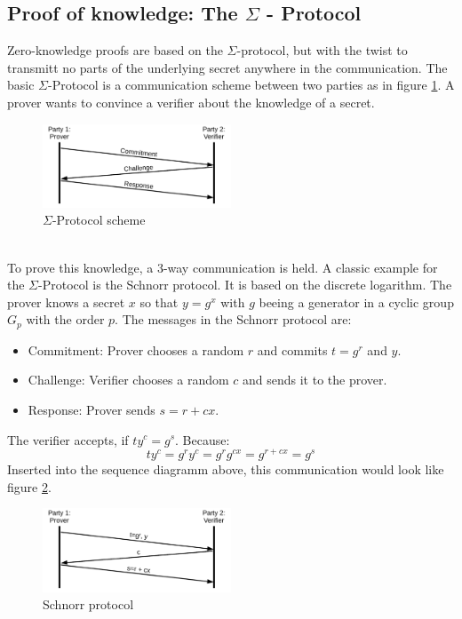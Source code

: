 \documentclass[]{article}
\begin{document}
\subsection{Proof of knowledge: The $\Sigma$ - Protocol}
Zero-knowledge proofs are based on the $\Sigma$-protocol, but with the twist to transmitt no parts of the underlying secret anywhere in the communication. The basic $\Sigma$-Protocol is a communication scheme between two parties as in figure \ref{fig:sigma}. A prover wants to convince a verifier about the knowledge of a secret. 
\begin{figure}[htbp]
\center
\includegraphics[width=0.5\textwidth]{pics/sigma.pdf}
\caption{$\Sigma$-Protocol scheme}
\label{fig:sigma}
\end{figure}\\
To prove this knowledge, a 3-way communication is held. A classic example for the $\Sigma$-Protocol is the Schnorr protocol. It is based on the discrete logarithm. The prover knows a secret $x$ so that $y=g^{x}$ with $g$ beeing a generator in a cyclic group $G_{p}$ with the order $p$. The messages in the Schnorr protocol are:
\begin{itemize}
\item{Commitment: Prover chooses a random $r$ and commits $t = g^{r}$ and $y$.}
\item{Challenge: Verifier chooses a random $c$ and sends it to the prover.}
\item{Response: Prover sends $s = r + cx$.}
\end{itemize}
The verifier accepts, if $ty^{c} = g^{s}$. Because:
\[ty^{c} = g^{r}y^{c} = g^{r}g^{cx} = g^{r + cx} = g^{s}\]
Inserted into the sequence diagramm above, this communication would look like figure \ref{fig:schnorr}.
\begin{figure}[htbp]
\center
\includegraphics[width=0.5\textwidth]{pics/schnorr.pdf}
\caption{Schnorr protocol}
\label{fig:schnorr}
\end{figure}
\end{document}
